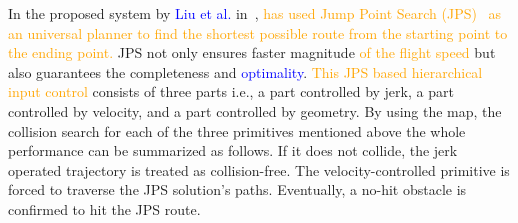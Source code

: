 In the proposed system by \textcolor{blue}{Liu et al.} in~\cite{liu2017planning}, \textcolor{orange}{has used Jump Point Search (JPS)~\cite{harabor2011online} as an universal planner to find the shortest possible route from the starting point to the ending point.} %
JPS not only ensures faster magnitude \textcolor{orange}{of the flight speed} but also guarantees the completeness and \textcolor{blue}{optimality}. \textcolor{orange}{This JPS based hierarchical input control} %
consists of three parts i.e., a part controlled by jerk, a part controlled by velocity, and a part controlled by geometry. By using the map, the collision search for each of the three primitives mentioned above the whole performance can be summarized as follows. If it does not collide, the jerk operated trajectory is treated as collision-free. The velocity-controlled primitive is forced to traverse the JPS solution's paths. Eventually, a no-hit obstacle is confirmed to hit the JPS route. 


